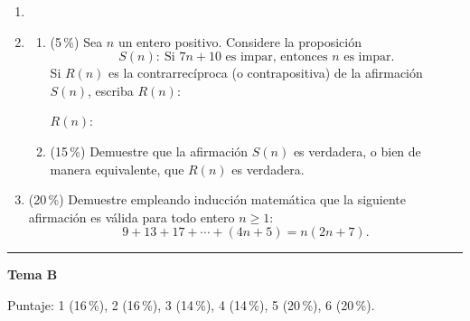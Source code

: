 \documentclass[11pt]{article}
\begin{document}
\begin{enumerate}
\item[]
\item[5.] \begin{enumerate}
  \item (5\,\%) Sea $n$ un entero positivo. Considere la proposición
  \[
  S(n) : \ \text{Si } 7n + 10 \text{ es impar, entonces } n \text{ es impar.}
  \]
  Si $R(n)$ es la contrarrecíproca (o contrapositiva) de la afirmación $S(n)$, escriba $R(n)$:

  \vspace{4pt}
  $R(n)$: \underline{\hspace{10cm}}
  \item (15\,\%) Demuestre que la afirmación $S(n)$ es verdadera, o bien de manera equivalente, que $R(n)$ es verdadera.
  \end{enumerate}

\item[6.] (20\,\%) Demuestre empleando inducción matemática que la siguiente afirmación es válida para todo entero $n \geq 1$:
\[
9 + 13 + 17 + \cdots + (4n + 5) = n(2n + 7).
\]
\end{enumerate}

\bigskip
\hrule
\bigskip

\begin{center}\bfseries\large Tema B\end{center}

\noindent Puntaje: 1 (16\,\%), 2 (16\,\%), 3 (14\,\%), 4 (14\,\%), 5 (20\,\%), 6 (20\,\%).
\end{document}
